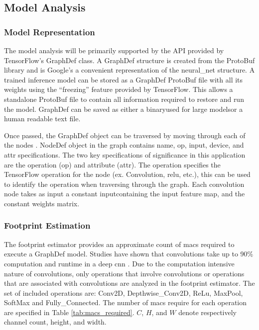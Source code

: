 \documentclass{uw-ece-wkrpt}
\begin{document}
\subsection{Model Analysis}

\subsubsection{Model Representation}

The model analysis will be primarily supported by the API provided by TensorFlow's GraphDef class. A GraphDef structure is created from the ProtoBuf library and is Google's a convenient representation of the \gls{neural_net} structure. A trained inference model can be stored as a GraphDef ProtoBuf file with all its weights using the ``freezing'' feature provided by TensorFlow. This allows a standalone ProtoBuf file to contain all information required to restore and run the model. GraphDef can be saved as either a binary\textemdash{}used for large models\textemdash{}or a human readable text file.

Once passed, the GraphDef object can be traversed by moving through each of the nodes \cite{Google-Inc.2018A-Tool-Develope}. NodeDef object in the graph contains name, op, input, device, and attr specifications. The two key specifications of significance in this application are the operation (op) and attribute (attr). The operation specifies the TensorFlow operation for the node (ex. Convolution, \gls{relu}, etc.), this can be used to identify the operation when traversing through the graph. Each convolution node takes as input a constant input\textemdash{}containing the input feature map, and the constant weights matrix.

\subsubsection{Footprint Estimation}

The footprint estimator provides an approximate count of \glspl{mac} required to execute a GraphDef model. Studies have shown that convolutions take up to 90\% computation and runtime in a deep \gls{cnn} \cite{Wang2017Data-centric-co}. Due to the computation intensive nature of convolutions, only operations that involve convolutions or operations that are associated with convolutions are analyzed in the footprint estimator. The set of included operations are: Conv2D, Depthwise\_Conv2D, ReLu, MaxPool, SoftMax and Fully\_Connected. The number of \glspl{mac} require for each operation are specified in Table \ref{tab:macs_required}. $C$, $H$, and $W$ denote respectively channel count, height, and width.
\end{document}
